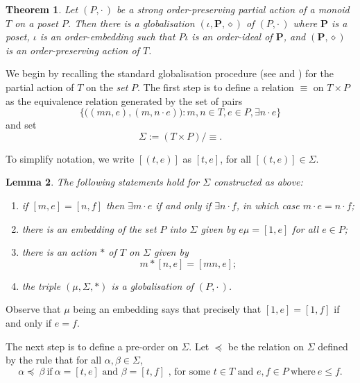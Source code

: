 \documentclass[12pt]{amsart}
\newtheorem{them}{Theorem}[section]
\newtheorem{lem}[them]{Lemma}
\theoremstyle{definition}
\theoremstyle{definition}
\numberwithin{them}{section}
\numberwithin{equation}{section}
\begin{document}
\begin{them}\label{them:orderglobal} Let $(P,\cdot\,)$ be a strong order-preserving partial action of a monoid $T$ on a poset $P$. 
Then there is a globalisation $(\iota, \mathbf{P}, \diamond)$ of $(P,\cdot\,)$ where $\mathbf{P}$ is a poset, $\iota$ is an order-embedding such that $P\iota$ is an order-ideal of $\mathbf{P}$,  and $(\mathbf{P},\diamond)$ is an order-preserving action of $T$.

\end{them}

We begin by recalling the standard globalisation procedure (see \cite{meg:2004} and \cite{hollings:2007}) for the partial action of $T$ on the {\em set} $P$.
The first step is to define a relation  $\equiv$ on $T \times P$ as the equivalence relation generated by the set of pairs
\[\{ \big((mn, e) , (m,n\cdot e)\big):  m,n\in T, e \in P, \exists n\cdot e \}\]
and set 
\[\Sigma := (T \times P)/\equiv.\]

To simplify notation, we write $[(t,e)]$ as $[t,e]$, for all $[(t,e)] \in \Sigma$.

   

\begin{lem}\label{actionFacts}\cite{meg:2004,hollings:2007}
The following statements hold for $\Sigma$ constructed as above:
\begin{enumerate}
\item[$(i)$] if  $[m,e]=[n,f]$ then $\exists m \cdot e$ if and only if  $\exists n \cdot f$, in which case $ m \cdot e = n \cdot f$;
\item[$(ii)$] there is an embedding of the  set $P$   into $\Sigma$ given by   $e\mu =[1,e] $  for all $e \in P$; 
\item[$(iii)$] there is an action $\ast$ of $T$ on $\Sigma$ given by
\[m \ast [n,e] = [mn,e];\]
\item[$(iv)$] the triple  $(\mu, \Sigma, \ast)$  is a globalisation of $(P,\cdot\, )$.  
\end{enumerate}
\end{lem}

Observe that $\mu$ being an embedding says that precisely that $[1,e] = [1,f]$ if and only if $e=f$.

The next step is to define a pre-order on $\Sigma$. Let  $\preceq$ be the relation on $\Sigma$ defined by the rule that for all $\alpha, \beta \in \Sigma$,
\[\alpha \preceq\ \beta\ \mbox{if}\ \alpha = [t, e]\mbox{ and } \beta= [t, f] \mbox{ , for some } t\in T \mbox{ and } e, f \in P \ \mbox{where}\ e \leq f. \]
\end{document}
